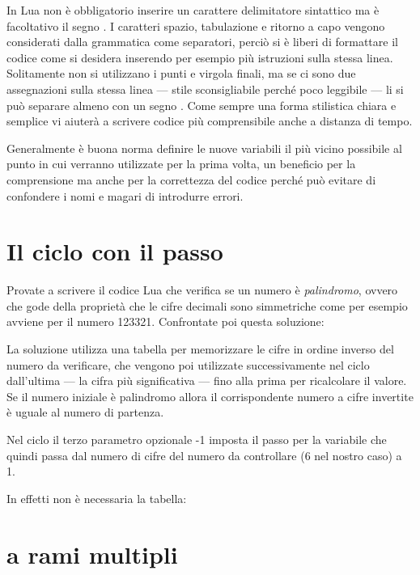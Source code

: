 In Lua non è obbligatorio inserire un carattere delimitatore sintattico ma è
facoltativo il segno \key{;}. I caratteri spazio, tabulazione e ritorno a capo
vengono considerati dalla grammatica come separatori, perciò si è liberi di
formattare il codice come si desidera inserendo per esempio più istruzioni sulla
stessa linea. Solitamente non si utilizzano i punti e virgola finali, ma se ci
sono due assegnazioni sulla stessa linea --- stile sconsigliabile perché poco
leggibile --- li si può separare almeno con un segno \key{;}. Come sempre una
forma stilistica chiara e semplice vi aiuterà a scrivere codice più
comprensibile anche a distanza di tempo.

Generalmente è buona norma definire le nuove variabili il più vicino possibile
al punto in cui verranno utilizzate per la prima volta, un beneficio per la
comprensione ma anche per la correttezza del codice perché può evitare di
confondere i nomi e magari di introdurre errori.


\section{Il ciclo  con il passo}

Provate a scrivere il codice Lua che verifica se un numero è \emph{palindromo},
ovvero che gode della proprietà che le cifre decimali sono simmetriche come per
esempio avviene per il numero 123321. Confrontate poi questa soluzione:

La soluzione utilizza una tabella per memorizzare le cifre in ordine inverso del
numero da verificare, che vengono poi utilizzate successivamente nel ciclo
 dall'ultima --- la cifra più significativa --- fino alla
prima per ricalcolare il valore. Se il numero iniziale è palindromo allora il
corrispondente numero a cifre invertite è uguale al numero di partenza.

Nel ciclo  il terzo parametro opzionale -1 imposta il passo per la
variabile  che quindi passa dal numero di cifre del numero da
controllare (6 nel nostro caso) a 1.

In effetti non è necessaria la tabella:


\section{ a rami multipli}

